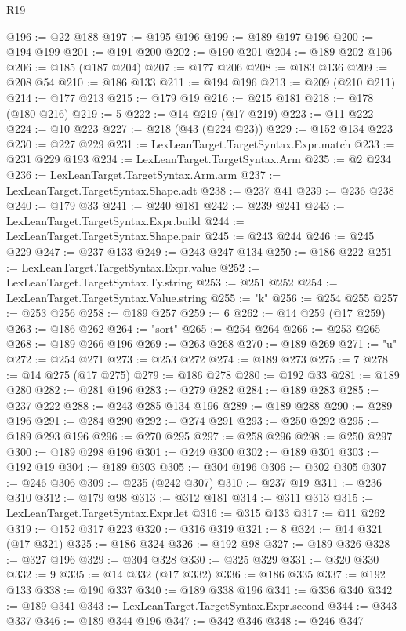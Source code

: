 \begin{lexlean}{R19}
\begin{coremodule}
@196 := @22 @188
@197 := @195 @196
@199 := @189 @197 @196
@200 := @194 @199
@201 := @191 @200
@202 := @190 @201
@204 := @189 @202 @196
@206 := @185 (@187 @204)
@207 := @177 @206
@208 := @183 @136
@209 := @208 @54
@210 := @186 @133
@211 := @194 @196
@213 := @209 (@210 @211)
@214 := @177 @213
@215 := @179 @19
@216 := @215 @181
@218 := @178 (@180 @216)
@219 := 5
@222 := @14 @219 (@17 @219)
@223 := @11 @222
@224 := @10 @223
@227 := @218 (@43 (@224 @23))
@229 := @152 @134 @223
@230 := @227 @229
@231 := LexLeanTarget.TargetSyntax.Expr.match
@233 := @231 @229 @193
@234 := LexLeanTarget.TargetSyntax.Arm
@235 := @2 @234
@236 := LexLeanTarget.TargetSyntax.Arm.arm
@237 := LexLeanTarget.TargetSyntax.Shape.adt
@238 := @237 @41
@239 := @236 @238
@240 := @179 @33
@241 := @240 @181
@242 := @239 @241
@243 := LexLeanTarget.TargetSyntax.Expr.build
@244 := LexLeanTarget.TargetSyntax.Shape.pair
@245 := @243 @244
@246 := @245 @229
@247 := @237 @133
@249 := @243 @247 @134
@250 := @186 @222
@251 := LexLeanTarget.TargetSyntax.Expr.value
@252 := LexLeanTarget.TargetSyntax.Ty.string
@253 := @251 @252
@254 := LexLeanTarget.TargetSyntax.Value.string
@255 := "k"
@256 := @254 @255
@257 := @253 @256
@258 := @189 @257
@259 := 6
@262 := @14 @259 (@17 @259)
@263 := @186 @262
@264 := "sort"
@265 := @254 @264
@266 := @253 @265
@268 := @189 @266 @196
@269 := @263 @268
@270 := @189 @269
@271 := "u"
@272 := @254 @271
@273 := @253 @272
@274 := @189 @273
@275 := 7
@278 := @14 @275 (@17 @275)
@279 := @186 @278
@280 := @192 @33
@281 := @189 @280
@282 := @281 @196
@283 := @279 @282
@284 := @189 @283
@285 := @237 @222
@288 := @243 @285 @134 @196
@289 := @189 @288
@290 := @289 @196
@291 := @284 @290
@292 := @274 @291
@293 := @250 @292
@295 := @189 @293 @196
@296 := @270 @295
@297 := @258 @296
@298 := @250 @297
@300 := @189 @298 @196
@301 := @249 @300
@302 := @189 @301
@303 := @192 @19
@304 := @189 @303
@305 := @304 @196
@306 := @302 @305
@307 := @246 @306
@309 := @235 (@242 @307)
@310 := @237 @19
@311 := @236 @310
@312 := @179 @98
@313 := @312 @181
@314 := @311 @313
@315 := LexLeanTarget.TargetSyntax.Expr.let
@316 := @315 @133
@317 := @11 @262
@319 := @152 @317 @223
@320 := @316 @319
@321 := 8
@324 := @14 @321 (@17 @321)
@325 := @186 @324
@326 := @192 @98
@327 := @189 @326
@328 := @327 @196
@329 := @304 @328
@330 := @325 @329
@331 := @320 @330
@332 := 9
@335 := @14 @332 (@17 @332)
@336 := @186 @335
@337 := @192 @133
@338 := @190 @337
@340 := @189 @338 @196
@341 := @336 @340
@342 := @189 @341
@343 := LexLeanTarget.TargetSyntax.Expr.second
@344 := @343 @337
@346 := @189 @344 @196
@347 := @342 @346
@348 := @246 @347

\end{coremodule}
\end{lexlean}
